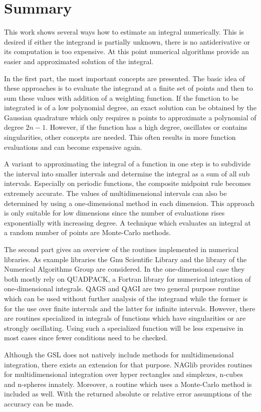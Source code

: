 \section{Summary}

This work shows several ways how to estimate an integral numerically. This is 
desired if either the integrand is partially unknown, there is no 
antiderivative or its computation is too expensive. At this point numerical 
algorithms provide an easier and approximated solution of the integral.

In the first part, the most important concepts are presented. The basic idea 
of these approaches is to evaluate the integrand at a finite set of points 
and then to sum these values with addition of a weighting function. If the 
function to be integrated is of a low polynomial degree, an exact solution 
can be obtained by the Gaussian quadrature which only requires n points to 
approximate a polynomial of degree $2n-1$. However, if the function has a 
high degree, oscillates or contains singularities, other concepts are needed. 
This often results in more function evaluations and can become expensive 
again. 

A variant to approximating the integral of a function in one step is to subdivide the interval into smaller intervals and determine the integral as a sum of all sub intervals. Especially on periodic functions, the composite midpoint rule becomes extremely accurate. The values of multidimensional intervals can also be determined by using a one-dimensional method in each dimension. This approach is only suitable for low dimensions since the number of evaluations rises exponentially with increasing degree. A technique which evaluates an integral at a random number of points are Monte-Carlo methods.

The second part gives an overview of the routines implemented in numerical 
libraries. As example libraries the Gnu Scientific Library and the library of 
the Numerical Algorithms Group are considered. In the one-dimensional case 
they both mostly rely on QUADPACK, a Fortran library for numerical 
integration of one-dimensional integrals. QAGS and QAGI are two general 
purpose routine which can be used without further analysis of the integrand 
while the former is for the use over finite intervals and the latter for 
infinite intervals. However, there are routines specialized in integrals of functions 
which have singularities or are strongly oscillating. Using such a 
specialized function will be less expensive in most cases since fewer 
conditions need to be checked.

Although the GSL does not natively include methods for multidimensional integration, 
there exists an extension for that purpose. NAGlib provides routines for 
multidimensional integration over hyper rectangles and simplexes, n-cubes and 
n-spheres innately. Moreover, a routine which uses a Monte-Carlo method is 
included as well. With the returned absolute or relative error assumptions of 
the accuracy can be made.




